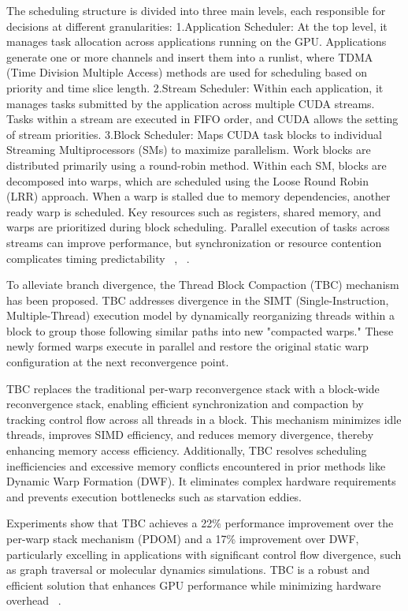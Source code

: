 The scheduling structure is divided into three main levels, each responsible for decisions at different granularities:
  1.Application Scheduler: At the top level, it manages task allocation across applications running on the GPU. Applications generate one or more channels and insert them into a runlist, where TDMA (Time Division Multiple Access) methods are used for scheduling based on priority and time slice length.
  2.Stream Scheduler: Within each application, it manages tasks submitted by the application across multiple CUDA streams. Tasks within a stream are executed in FIFO order, and CUDA allows the setting of stream priorities.
  3.Block Scheduler: Maps CUDA task blocks to individual Streaming Multiprocessors (SMs) to maximize parallelism. Work blocks are distributed primarily using a round-robin method. Within each SM, blocks are decomposed into warps, which are scheduled using the Loose Round Robin (LRR) approach. When a warp is stalled due to memory dependencies, another ready warp is scheduled. Key resources such as registers, shared memory, and warps are prioritized during block scheduling.
Parallel execution of tasks across streams can improve performance, but synchronization or resource contention complicates timing predictability ~\cite{Bakhoda2009}, ~\cite{Sanudo2020}.

To alleviate branch divergence, the Thread Block Compaction (TBC) mechanism has been proposed. TBC addresses divergence in the SIMT (Single-Instruction, Multiple-Thread) execution model by dynamically reorganizing threads within a block to group those following similar paths into new "compacted warps." These newly formed warps execute in parallel and restore the original static warp configuration at the next reconvergence point.

TBC replaces the traditional per-warp reconvergence stack with a block-wide reconvergence stack, enabling efficient synchronization and compaction by tracking control flow across all threads in a block. This mechanism minimizes idle threads, improves SIMD efficiency, and reduces memory divergence, thereby enhancing memory access efficiency. Additionally, TBC resolves scheduling inefficiencies and excessive memory conflicts encountered in prior methods like Dynamic Warp Formation (DWF). It eliminates complex hardware requirements and prevents execution bottlenecks such as starvation eddies.

Experiments show that TBC achieves a 22\% performance improvement over the per-warp stack mechanism (PDOM) and a 17\% improvement over DWF, particularly excelling in applications with significant control flow divergence, such as graph traversal or molecular dynamics simulations. TBC is a robust and efficient solution that enhances GPU performance while minimizing hardware overhead ~\cite{Fung2011HPC}.

